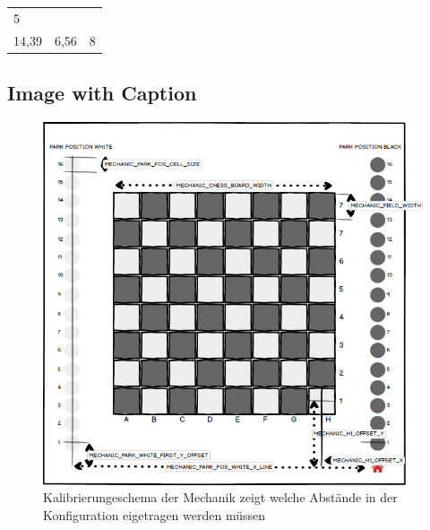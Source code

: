 \begin{longtable}[]{@{}lll@{}}
\begin{minipage}[t]{0.34\columnwidth}
5\strut
\end{minipage}\tabularnewline
\begin{minipage}[t]{0.29\columnwidth}\raggedright
14,39\strut
\end{minipage} & \begin{minipage}[t]{0.29\columnwidth}\raggedright
6,56\strut
\end{minipage} & \begin{minipage}[t]{0.34\columnwidth}\raggedright
8\strut
\end{minipage}\tabularnewline
\bottomrule
\end{longtable}

\hypertarget{image-with-caption}{%
\subsection{Image with Caption}\label{image-with-caption}}

\begin{figure}
\centering
\includegraphics{images/ATC_Calibration_Guide.png}
\caption{Kalibrierungeschema der Mechanik zeigt welche Abstände in der
Konfiguration eigetragen werden müssen}
\end{figure}